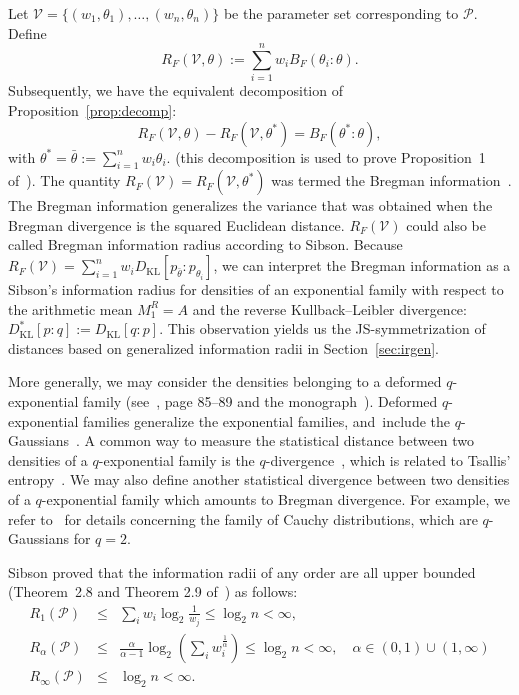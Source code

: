 \documentclass[entropy,article,accept,oneauthor,pdftex,entropy]{Definitions/mdpi}
\def\calV{\mathcal{V}}
\def\KL{\mathrm{KL}}
\def\calP{\mathcal{P}}
\begin{document}
\begin{paracol}{2}
Let $\calV=\{(w_1,\theta_1),\ldots,(w_n,\theta_n)\}$ be the parameter set corresponding to $\calP$. 
Define
\begin{equation}
R_F(\calV,\theta) := \sum_{i=1}^n w_i B_F(\theta_i:\theta).
\end{equation}
Subsequently, we have the equivalent decomposition of Proposition~\ref{prop:decomp}:
\begin{equation}
R_F(\calV,\theta)-R_F(\calV,\theta^*) = B_F(\theta^*:\theta),
\end{equation}
with $\theta^*=\bar{\theta}:=\sum_{i=1}^n w_i\theta_i$.
(this decomposition is used to prove Proposition~1 of~\cite{BregmanKmeans-2005}).
The quantity $R_F(\calV)=R_F(\calV,\theta^*)$ was termed the Bregman information~\cite{BregmanKmeans-2005,SBD-2009}.
The Bregman information generalizes the variance that was obtained when the Bregman divergence is the squared Euclidean distance.
 $R_F(\calV)$ could also be called Bregman information radius according to Sibson.
Because $R_F(\calV)=\sum_{i=1}^n w_i D_\KL[p_{\bar{\theta}}:p_{\theta_i}]$, we can interpret the Bregman information as a Sibson's information radius for densities of an exponential family with respect to the arithmetic mean $M_1^R=A$ and the reverse Kullback--Leibler divergence: $D_\KL^*[p:q]:=D_\KL[q:p]$.
This observation yields us the JS-symmetrization of distances based on generalized information radii in Section~\ref{sec:irgen}.

More generally, we may consider the densities belonging to a deformed $q$-exponential family (see~\cite{IG-2016}, page 85--89 and the monograph~\cite{Naudts-2011}). Deformed $q$-exponential families generalize the exponential families, and~include the $q$-Gaussians~\cite{IG-2016}.
A common way to measure the statistical distance between two densities of a $q$-exponential family is the $q$-divergence~\cite{IG-2016}, which is related to Tsallis' entropy~\cite{Tsallis-1988}.
We may also define another statistical divergence between two densities of a $q$-exponential family which amounts to Bregman divergence.
For example, we refer to~\cite{VoronoiCauchy-2020} for details concerning the family of Cauchy distributions, which are $q$-Gaussians for $q=2$.


Sibson proved that the information radii of any order are all upper bounded (Theorem~2.8 and Theorem 2.9 of~\cite{Sibson-1969}) as follows:
\begin{eqnarray}
R_1(\calP) &\leq& \sum_i w_i \log_2  \frac{1}{w_j}\leq \log_2 n<\infty,\label{eq:sub1}\\
R_\alpha(\calP) &\leq&  \frac{\alpha}{\alpha-1} \log_2 \left(\sum_i w_i^{\frac{1}{\alpha}}\right)  \leq \log_2 n<\infty, \quad \alpha\in(0,1)\cup(1,\infty)\label{eq:sub2}\\
R_\infty(\calP)  &\leq&  \log_2 n<\infty.\label{eq:sub3}
\end{eqnarray}


\end{paracol}
\end{document}
